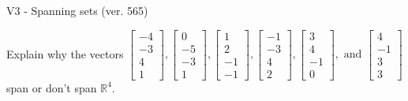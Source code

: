 \begin{exercise}
  \begin{exerciseTitle}V3 - Spanning sets (ver. 565)\end{exerciseTitle}
  \begin{exerciseStatement}
    Explain why the vectors \(\left[\begin{array}{r}
-4 \\
-3 \\
4 \\
1
\end{array}\right] , \left[\begin{array}{r}
0 \\
-5 \\
-3 \\
1
\end{array}\right] , \left[\begin{array}{r}
1 \\
2 \\
-1 \\
-1
\end{array}\right] , \left[\begin{array}{r}
-1 \\
-3 \\
4 \\
2
\end{array}\right] , \left[\begin{array}{r}
3 \\
4 \\
-1 \\
0
\end{array}\right] , \text{ and } \left[\begin{array}{r}
4 \\
-1 \\
3 \\
3
\end{array}\right]\) span or don't span \(\mathbb{R}^4\). 
	



\end{exerciseStatement}
\end{exercise}
